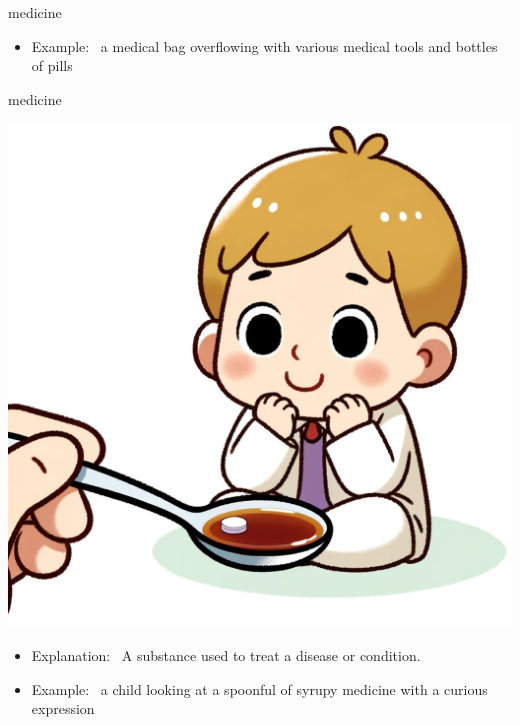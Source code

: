 \documentclass[avery5371, grid,frame]{flashcards}
\begin{document}
\begin{flashcard}{medicine}
\begin{center}
\begin{minipage}[c]{.45\textwidth}
\begin{itemize}
            \item Example: \ a medical bag overflowing with various medical tools and bottles of pills
            \end{itemize}
        \end{minipage}
    \end{center}
    \vspace*{\fill}
\end{flashcard}\begin{flashcard}{medicine}
    \vspace*{\fill}
    \begin{center}
        \begin{minipage}[c]{.45\textwidth}
            \includegraphics[width=\textwidth]{cards/m/medicine/medicine - a child looking at a spoonful of syrupy medicine with a curious expression.png}
        \end{minipage}
        \begin{minipage}[c]{.45\textwidth}
            \begin{itemize}\setlength\itemsep{12pt}
            \item Explanation: \ A substance used to treat a disease or condition.

            \item Example: \ a child looking at a spoonful of syrupy medicine with a curious expression
            \end{itemize}
        \end{minipage}
    \end{center}
    \vspace*{\fill}
\end{flashcard}
\end{document}
